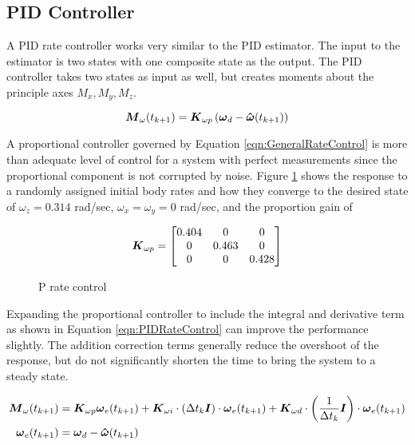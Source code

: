 \subsection{PID Controller}
\label{subsec:PIDRateControl}

A PID rate controller works very similar to the PID estimator.  The input to the estimator is two states with one composite state as the output.  The PID controller takes two states as input as well, but creates moments about the principle axes $M_x, M_y, M_z$.

\begin{equation}
  \boldsymbol{M}_{\omega}(t_{k+1}) = \boldsymbol{K}_{\omega p} \left( \boldsymbol{\omega}_d - \boldsymbol{\hat{\omega}}(t_{k+1}) \right)
  \label{eqn:PIDRateControl}
\end{equation}

A proportional controller governed by Equation \ref{eqn:GeneralRateControl} is more than adequate level of control for a system with perfect measurements since the proportional component is not corrupted by noise.  Figure \ref{fig:PRateControl} shows the response to a randomly assigned initial body rates and how they converge to the desired state of $\omega_z = 0.314$ rad/sec, $\omega_x = \omega_y = 0$ rad/sec, and the proportion gain of

\begin{equation}
  \boldsymbol{K}_{\omega p} = \begin{bmatrix} 0.404 & 0 & 0 \\ 0 & 0.463 & 0 \\ 0 & 0 & 0.428 \end{bmatrix}
\end{equation}

\begin{figure}[H]
  \centerline{}
  \caption{P rate control}
  \label{fig:PRateControl}
\end{figure}

Expanding the proportional controller to include the integral and derivative term as shown in Equation \ref{eqn:PIDRateControl} can improve the performance slightly.  The addition correction terms generally reduce the overshoot of the response, but do not significantly shorten the time to bring the system to a steady state.

\begin{equation}
  \begin{aligned}
    \boldsymbol{M}_{\omega}(t_{k+1}) &= \boldsymbol{K}_{\omega p} \boldsymbol{\omega}_e(t_{k+1}) + \boldsymbol{K}_{\omega i} \cdot (\Delta t_k \boldsymbol{I})\cdot \boldsymbol{\omega}_e(t_{k+1}) + \boldsymbol{K}_{\omega d} \cdot \left(\frac{1}{\Delta t_k} \boldsymbol{I}\right) \cdot \boldsymbol{\omega}_e(t_{k+1}) \\
    \boldsymbol{\omega}_e(t_{k+1}) &= \boldsymbol{\omega}_d - \boldsymbol{\hat{\omega}}(t_{k+1}) \\
  \end{aligned}
  \label{eqn:PRateControl}
\end{equation}

